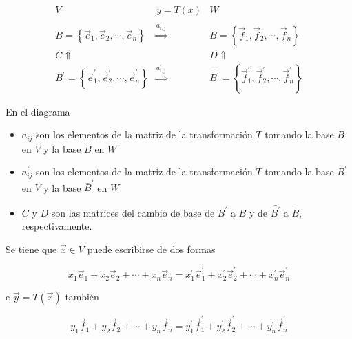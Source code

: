 \newcommand{\stk}[1]{\stackrel{#1}
{\Longrightarrow}}
\newcommand{\cT}{\mathcal{T}}
\newcommand{\dwn}[1]{
{\scriptstyle #1}\Uparrow}
\[
\begin{array}{ccc}
      V           & y=T(x)         &    W        \\\\
B= \left\{\vec{e}_1,\vec{e}_2,\cdots, \vec{e}_n\right\}    & \stk{a_{i,j}}  &  \bar{B}= \left\{\vec{f}_1,\vec{f}_2,\cdots, \vec{f}_n\right\} \\
\dwn{C}  &      &  \dwn{D} \\
B^{\prime}= \left\{\vec{e}^{\prime}_1,\vec{e}^{\prime}_2,\cdots, \vec{e}^{\prime}_n\right\}  & \stk{a^{\prime}_{i,j}}    &  \bar{B^{\prime}}= \left\{\vec{f}^{\prime}_1,\vec{f}^{\prime}_2,\cdots, \vec{f}^{\prime}_n\right\}
\end{array}
\]

\bigskip

\bigskip

En el diagrama

\bigskip

\begin{itemize}
\item

$a_{ij}$ son los elementos de  la matriz de la transformación $T$ tomando la base $ B$ en $V$ y la base  $\bar{B}$ en $W$   
\item
$a^{\prime}_{ij}$ son los elementos de  la matriz de la transformación $T$ tomando la base $ B^{\prime}$ en $V$ y la base  $\bar{B}^{\prime}$ en $W$   \item
 $C$ y $D$ son las matrices del cambio de base de $B^{\prime}$ a $B$ y de $\bar{B^{\prime}}$ a $\bar{B}$, respectivamente.
\end{itemize}

\bigskip


Se tiene que $\vec{x}\in V$ puede escribirse de dos formas 

\bigskip

$$ x_1\vec{e}_1+x_2\vec{e}_2+\cdots +x_n\vec{e}_n = x^{\prime}_1\vec{e}^{\prime}_1+x^{\prime}_2\vec{e}^{\prime}_2+\cdots +x^{\prime}_n\vec{e}^{\prime}_n $$


\bigskip
e   $\vec{y}=T(\vec{x})$ también


\bigskip

$$ y_1\vec{f}_1+y_2\vec{f}_2+\cdots +y_n\vec{f}_n = y^{\prime}_1\vec{f}^{\prime}_1+y^{\prime}_2\vec{f}^{\prime}_2+\cdots +y^{\prime}_n\vec{f}^{\prime}_n $$



